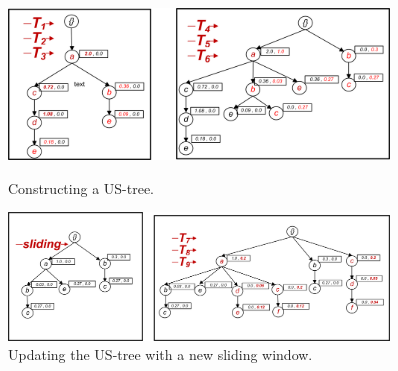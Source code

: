 \documentclass[10pt, conference, compsocconf]{IEEEtran}
\begin{document}
\begin{figure}[t]
    \begin{minipage}{0.45\linewidth}
        \centering
  		\includegraphics[width=0.9\textwidth]{visio/sim_1_6_V2}
		\vspace*{-3mm}
  		\caption{Constructing a US-tree.}
  		\label{figure:t1_6}
    \end{minipage}%
    \begin{minipage}{0.55\linewidth}
         \centering
  		 \includegraphics[width=0.9\textwidth]{visio/sim_06_slide_789_V2}
		\vspace*{-3mm}
  		 \caption{Updating the US-tree with a new sliding window.}
  		 \label{figure:t7_9}
    \end{minipage}	
\end{figure}
\end{document}
